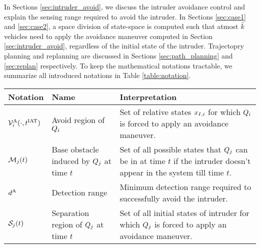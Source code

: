 In Sections \ref{sec:intruder_avoid}, we discuss the intruder avoidance control and explain the sensing range required to avoid the intruder. In Sections \ref{sec:case1} and \ref{sec:case2}, a space division of state-space is computed such that atmost $\bar{k}$ vehicles need to apply the avoidance maneuver computed in Section \ref{sec:intruder_avoid}, regardless of the initial state of the intruder. %
Trajectopry planning and replanning are discussed in Sections \ref{sec:path_planning} and \ref{sec:replan} respectively. To keep the mathematical notations tractable, we summarize all introduced notations in Table \ref{table:notation}.

\begin{table*}
    \begin{tabular}{ | l | l | l |}
    \hline
    \textbf{Notation} & \textbf{Name} & \textbf{Interpretation} \\ \hline
    
    $\mathcal{V}^{\text{A}}_{i}(\cdot, t^\text{IAT})$ & Avoid region of $Q_i$ & Set of relative states $x_{I, i}$ for which $Q_i$ is forced to apply an avoidance maneuver. \\ \hline
    
    $\mathcal{M}_j(t)$ & Base obstacle induced by $Q_j$ at time $t$ & Set of all possible states that $Q_j$ can be in at time $t$ if the intruder doesn't appear in the system till time $t$. \\ \hline
     
    $d^\text{A}$ & Detection range & Minimum detection range required to successfully avoid the intruder. \\ \hline
    
    $\mathcal{S}_j(t)$ & Separation region of $Q_j$ at time $t$ & Set of all initial states of intruder for which $Q_j$ is forced to apply an avoidance maneuver. \\ \hline
    
    \end{tabular}
    \caption{Different mathematical notations and their interpretation.}
    \label{table:notation}
\end{table*}